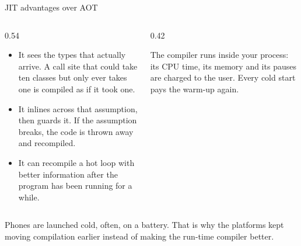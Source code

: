 \documentclass[10pt,aspectratio=169,t]{beamer}
\begin{document}
\begin{frame}[eyebrow=Compilation]{JIT advantages over AOT}
  \vskip 2mm
  \begin{columns}[T]
    \begin{column}{0.54\textwidth}
      \begin{itemize}
        \item It sees the types that actually arrive. A call site that could take ten classes but only ever takes one is compiled as if it took one.
        \item It inlines across that assumption, then guards it. If the assumption breaks, the code is thrown away and recompiled.
        \item It can recompile a hot loop with better information after the program has been running for a while.
      \end{itemize}
    \end{column}
    \begin{column}{0.42\textwidth}
      \begin{warning}
        The compiler runs inside your process: its CPU time, its memory and its pauses are charged to the user. Every cold start pays the warm-up again.
      \end{warning}
    \end{column}
  \end{columns}
  \begin{takeaway}{Phones are launched cold, often, on a battery.}
    That is why the platforms kept moving compilation earlier instead of making the run-time compiler better.
  \end{takeaway}
\end{frame}
\end{document}
